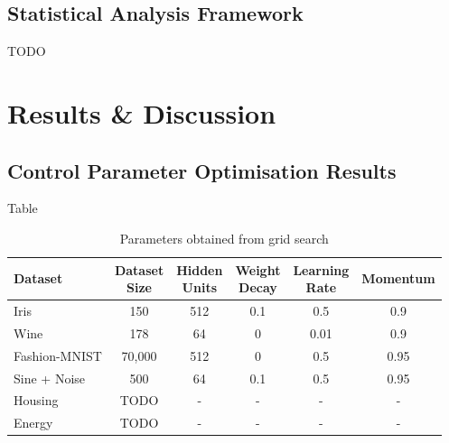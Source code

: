 \documentclass[10pt, conference]{IEEEtran}
\begin{document}
\subsection{Statistical Analysis Framework}
TODO

\section{Results \& Discussion}



\subsection{Control Parameter Optimisation Results}
Table 
\begin{table}[htbp]
	\centering
	\caption{Parameters obtained from grid search}
	\begin{tabular}{|l|c|c|c|c|c|}
		\hline
		\textbf{Dataset} & \makecell{\textbf{Dataset} \\ \textbf{Size}} & \makecell{\textbf{Hidden} \\ \textbf{Units}} & \makecell{\textbf{Weight} \\ \textbf{Decay}} & \makecell{\textbf{Learning} \\ \textbf{Rate}} & \textbf{Momentum} \\
		\hline
		Iris & 150 & 512 & 0.1 & 0.5 & 0.9 \\
		Wine & 178 & 64 & 0 & 0.01 & 0.9 \\
		Fashion-MNIST & 70,000 & 512 & 0 & 0.5 & 0.95 \\
		\hline
		Sine + Noise & 500 & 64 & 0.1 & 0.5 & 0.95 \\
		Housing & TODO & - & - & - & - \\
		Energy & TODO & - & - & - & - \\
		\hline
	\end{tabular}
	\label{tab:datasets}
\end{table}
\end{document}
